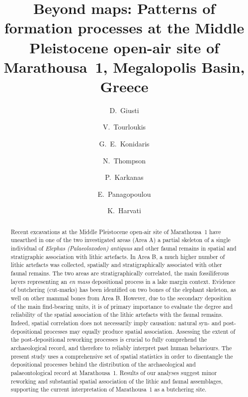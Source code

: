 \documentclass[review,authoryear,times]{elsarticle} %
\begin{document}
\begin{frontmatter}
  
  \title{Beyond maps: Patterns of formation processes at the Middle Pleistocene open-air site of Marathousa~1, Megalopolis Basin, Greece}
  
  \author[tue]{D.~Giusti}
  
  \author[tue]{V.~Tourloukis}
  \author[tue]{G.~E.~Konidaris}
  \author[tue]{N.~Thompson}
  \author[wiener]{P.~Karkanas}
  \author[ephoreia]{E.~Panagopoulou}
  \author[tue]{K.~Harvati}
  
  \address[tue]{Paläoanthropologie, Senckenberg Centre for Human Evolution and Palaeoenvironment, Eberhard Karls Universität Tübingen, Rümelinstr. 23, 72070 Tübingen, Germany}
  \address[erlangen]{Friedrich-Alexander University of Erlangen-Nürnberg, Institute of Prehistory and Early History, Kochstr. 4/18, 90154 Erlangen, Germany}
  \address[wiener]{Malcolm H. Wiener Laboratory for Archaeological Science, American School of Classical Studies at Athens, Greece}
  \address[ephoreia]{Ephoreia of Palaeoanthropology-Speleology of Greece, Athens, Greece}

  \begin{abstract}
    Recent excavations at the Middle Pleistocene open-air site of Marathousa~1 have unearthed in one of the two investigated areas (Area A) a partial skeleton of a single individual of \emph{Elephas (Palaeoloxodon) antiquus} and other faunal remains in spatial and stratigraphic association with lithic artefacts. In Area B, a much higher number of lithic artefacts was collected, spatially and stratigraphically associated with other faunal remains. The two areas are stratigraphically correlated, the main fossiliferous layers representing an \emph{en mass} depositional process in a lake margin context. Evidence of butchering (cut-marks) has been identified on two bones of the elephant skeleton, as well on other mammal bones from Area B.
    However, due to the secondary deposition of the main find-bearing units, it is of primary importance to evaluate the degree and reliability of the spatial association of the lithic artefacts with the faunal remains. Indeed, spatial correlation does not necessarily imply causation: natural syn- and post-depositional processes may equally produce spatial association.
    Assessing the extent of the post-depositional reworking processes is crucial to fully comprehend the archaeological record, and therefore to reliably interpret past human behaviours.
    The present study uses a comprehensive set of spatial statistics in order to disentangle the depositional processes behind the distribution of the archaeological and palaeontological record at Marathousa~1.
    Results of our analyses suggest minor reworking and substantial spatial association of the lithic and faunal assemblages, supporting the current interpretation of Marathousa~1 as a butchering site.
  \end{abstract}


\end{frontmatter}
\end{document}
